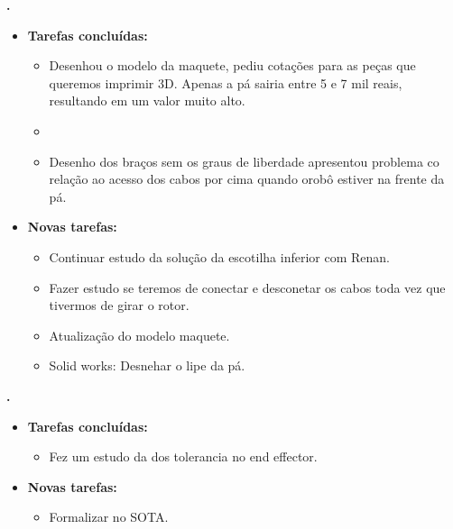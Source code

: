    \textbf{.} 
	\begin{itemize}
		\item \textbf{Tarefas concluídas:}
			\begin{itemize}    
				\item Desenhou o modelo da maquete, pediu cotações para as peças que
				queremos imprimir 3D. Apenas a pá sairia entre 5 e 7 mil reais, resultando
				em um valor muito alto. 
				\item 
				\item Desenho dos braços sem os graus de liberdade apresentou problema co
				relação ao acesso dos cabos por cima quando orobô estiver na frente da pá.
				
			\end{itemize}
		
		\item \textbf{Novas tarefas:}
			\begin{itemize} 
			    \item Continuar estudo da solução da escotilha inferior com Renan.
			    \item Fazer estudo se teremos de conectar e desconetar os cabos toda vez
			    que tivermos de girar o rotor.
				\item Atualização do modelo maquete.
			    \item Solid works: Desnehar o lipe da pá.
			\end{itemize}
	\end{itemize}

	  \textbf{\Renan.} 
	\begin{itemize}
		\item \textbf{Tarefas concluídas:}
			\begin{itemize}    
				\item Fez um estudo da dos tolerancia no end effector. 
			\end{itemize}
		
		\item \textbf{Novas tarefas:}
			\begin{itemize} 
			    \item Formalizar no SOTA. 
			\end{itemize}
	\end{itemize}		
			
